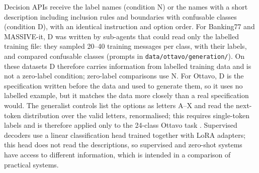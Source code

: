 Decision APIs receive the label names (condition N) or the names with a short description including inclusion rules and boundaries
with confusable classes (condition D), with an identical instruction and option order. For Banking77 and MASSIVE-it, D was written by
sub-agents that could read only the labelled training file: they sampled 20--40 training messages per class, with their labels, and
compared confusable classes (prompts in \texttt{data/ottavo/generation/}). On these datasets D therefore carries information from
labelled training data and is not a zero-label condition; zero-label comparisons use N. For Ottavo, D is the specification written
before the data and used to generate them, so it uses no labelled example, but it matches the data more closely than a real
specification would. The generalist
controls list the options as letters A--X and read the next-token distribution over the valid letters, renormalised; this
requires single-token labels and is therefore applied only to the 24-class Ottavo task \citep{qwen3,qwen35card}.
Supervised decoders use a linear classification head trained together with LoRA adapters; this head does not read the descriptions,
so supervised and zero-shot systems have access to different information, which is intended in a comparison of practical systems.

